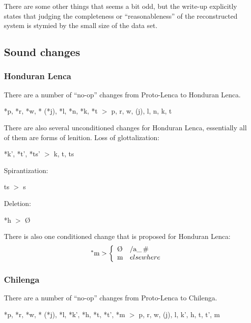 \documentclass[12pt]{article}
\begin{document}
There are some other things that seems a bit odd, but the write-up explicitly states that judging the completeness or ``reasonableness'' of the reconstructed system is stymied by the small size of the data set.

\subsection{Sound changes}

\subsubsection{Honduran Lenca}

There are a number of ``no-op'' changes from Proto-Lenca to Honduran Lenca. \begin{center}
*p, *r, *w, * (*j), *l, *n, *k, *t $>$ p, r, w,  (j), l, n, k, t 
\end{center}

There are also several unconditioned changes for Honduran Lenca, essentially all of them are forms of lenition.
Loss of glottalization:
\begin{center}
*k', *t', *ts' $>$ k, t, ts
\end{center}
Spirantization:
\begin{center}
ts $>$ s
\end{center}
Deletion:
\begin{center}
*h $>$ \O
\end{center}

There is also one conditioned change that is proposed for Honduran Lenca:
\begin{align*}
^*\textrm{m} > 
\left\{
\begin{array}{ll} 
  \textrm{\O} & /\textrm{a}\und\# \\ 
  \textrm{m} & elsewhere 
\end{array}
\right. 
\end{align*}

\subsubsection{Chilenga}

There are a number of ``no-op'' changes from Proto-Lenca to Chilenga.
\begin{center}
*p, *r, *w, * (*j), *l, *k', *h, *t, *t', *m $>$ p, r, w,  (j), l, k', h, t, t', m
\end{center}
\end{document}
